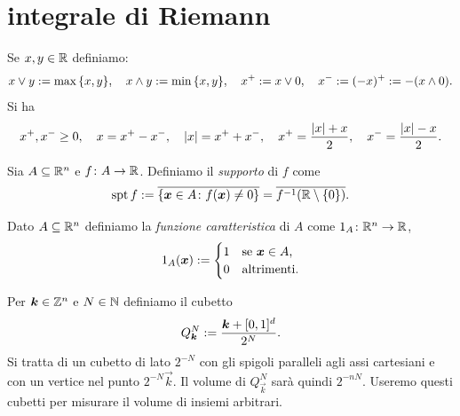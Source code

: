 \section{integrale di Riemann}
Se $x,y\in {\mathbb R}$ definiamo:
\[
    x \vee y := \max{\left\{ x,y \right\}},
    \quad
    x \wedge y := \min{\left\{ x,y \right\}},
    \quad
    x^+ := x \vee 0,
    \quad
    x^- := (-x)^+ := -(x\wedge 0).
\]
Si ha
\[
    x^+,x^-\ge 0,
    \quad
    x = x^+ - x^-,
    \quad 
    {\left|x\right|} = x^+ + x^-,
    \quad
    x^+ = \frac{{\left|x\right|}+x}{2},
    \quad
    x^- = \frac{{\left|x\right|}-x}{2}.
\]

Sia $A\subseteq {\mathbb R}^n$ e $f\colon A \to {\mathbb R}$. 
Definiamo il \emph{supporto} di $f$ come 
\[
 \operatorname{spt} f 
    := \overline{{\left\{ \boldsymbol x \in A \colon f(\boldsymbol x) \neq 0 \right\}}}
    = \overline{f^{-1}({\mathbb R}\setminus{\left\{ 0 \right\}})}.
\]

Dato $A\subseteq {\mathbb R}^n$ definiamo la \emph{funzione caratteristica}
di $A$ come $1_A\colon {\mathbb R}^n \to {\mathbb R}$,
\[
  1_A(\boldsymbol x) := \begin{cases}
    1 & \text{se $\boldsymbol x \in A$,}\\
    0 & \text{altrimenti.}
  \end{cases}
\]

Per $\boldsymbol k \in {\mathbb Z}^n$ e $N\in {\mathbb N}$ definiamo 
il cubetto 
\[
  Q^N_{\boldsymbol k} := \frac{\boldsymbol k + [0,1]^d}{2^N}.
\]
Si tratta di un cubetto di lato $2^{-N}$ con gli spigoli paralleli 
agli assi cartesiani e con un vertice nel punto $2^{-N} \vec k$.
Il volume di $Q^N_{\vec k}$ sarà quindi $2^{-nN}$.
Useremo questi cubetti per misurare il volume di insiemi arbitrari.

